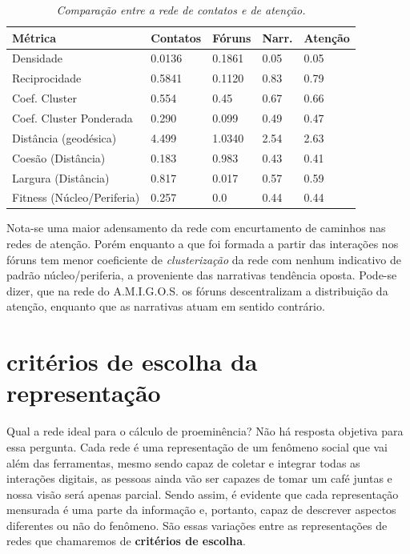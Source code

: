 \documentclass{article}
\begin{document}
\begin{table}[htbp]
\begin{boxedminipage}{\textwidth}
		\setlength{\arrayrulewidth}{2\arrayrulewidth}  %
		\setlength{\belowcaptionskip}{10pt}  %
		\caption{\it Comparação entre a rede de contatos e de atenção.}
		\centering   %
		\begin{tabular}{| l | l | l | l | l |}
		\hline
		Métrica & Contatos & Fóruns & Narr. & Atenção \\ \hline
		Densidade & 0.0136 & 0.1861 & 0.05 & 0.05\\
		Reciprocidade & 0.5841 & 0.1120 & 0.83 & 0.79\\
		Coef. Cluster & 0.554 & 0.45 & 0.67 & 0.66\\
		Coef. Cluster Ponderada & 0.290 & 0.099 & 0.49 & 0.47\\
		Distância (geodésica) & 4.499 & 1.0340 & 2.54 & 2.63\\
		Coesão (Distância) & 0.183 & 0.983 & 0.43 & 0.41\\
		Largura (Distância) & 0.817 & 0.017 & 0.57 & 0.59\\
		Fitness (Núcleo/Periferia) & 0.257 & 0.0 & 0.44 & 0.44\\
		\hline
		\end{tabular}
		\label{tab:comparacao_contato_atencao}
		\flushleft
		\normalsize
		Nota-se uma maior adensamento da rede com encurtamento de caminhos nas redes
		de atenção. Porém enquanto a que foi formada a partir das interações nos
		fóruns tem menor coeficiente de \textit{clusterização} da rede com nenhum
		indicativo de padrão núcleo/periferia, a proveniente das narrativas tendência
		oposta. Pode-se dizer, que na rede do A.M.I.G.O.S. os fóruns descentralizam a
		distribuição da atenção, enquanto que as narrativas atuam em sentido
		contrário.
	\end{boxedminipage}
\end{table}

\section{critérios de escolha da representação}

Qual a rede ideal para o cálculo de proeminência? Não há resposta objetiva para
essa pergunta. Cada rede é uma representação de um fenômeno social que vai além
das ferramentas, mesmo sendo capaz de coletar e integrar todas as interações
digitais, as pessoas ainda vão ser capazes de tomar um café juntas e nossa visão
será apenas parcial. Sendo assim, é evidente que cada representação mensurada é
uma parte da informação e, portanto, capaz de descrever aspectos diferentes ou
não do fenômeno. São essas variações entre as representações de redes que
chamaremos de \textbf{critérios de escolha}.
\end{document}
